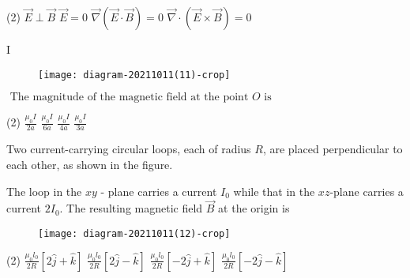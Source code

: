 \begin{enumerate}
\begin{minipage}{\textwidth}
\end{minipage}
\begin{tasks}(2)
	\task[\textbf{A.}] $\vec{E} \perp \vec{B}$
	\task[\textbf{B.}] $\vec{E}=0$
	\task[\textbf{C.}]$\vec{\nabla}(\vec{E} \cdot \vec{B})=0$
	\task[\textbf{D.}]$\vec{\nabla} \cdot(\vec{E} \times \vec{B})=0$
\end{tasks}
\begin{minipage}{\textwidth}
	\item {} I \\
	\begin{figure}[H]
		\centering
		\texttt{[image: diagram-20211011(11)-crop]}
	\end{figure}
	$\text { The magnitude of the magnetic field at the point } O \text { is }$
\end{minipage}
\begin{tasks}(2)
	\task[\textbf{A.}] $\frac{\mu_{0} I}{2 a}$
	\task[\textbf{B.}]$\frac{\mu_{0} I}{6 a}$
	\task[\textbf{C.}]$\frac{\mu_{0} I}{4 a}$
	\task[\textbf{D.}]$\frac{\mu_{0} I}{3 a}$
\end{tasks}
\begin{minipage}{\textwidth}
	\item Two current-carrying circular loops, each of radius $R$, are placed perpendicular to each other, as shown in the figure.
	
	The loop in the $x y$ - plane carries a current $I_{0}$ while that in the $x z$-plane carries a current $2 I_{0}$. The resulting magnetic field $\vec{B}$ at the origin is
	\begin{figure}[H]
		\centering
		\texttt{[image: diagram-20211011(12)-crop]}
	\end{figure}
\end{minipage}
\begin{tasks}(2)
	\task[\textbf{A.}] $\frac{\mu_{0} l_{0}}{2 R}[2 \hat{j}+\hat{k}]$ 
	\task[\textbf{B.}]$\frac{\mu_{0} l_{0}}{2 R}[2 \hat{j}-\hat{k}]$
	\task[\textbf{C.}]$\frac{\mu_{0} l_{0}}{2 R}[-2 \hat{j}+\hat{k}]$
	\task[\textbf{D.}]$\frac{\mu_{0} l_{0}}{2 R}[-2 \hat{j}-\hat{k}]$
\end{tasks}
\end{enumerate}
\setlength\arrayrulewidth{1pt}
